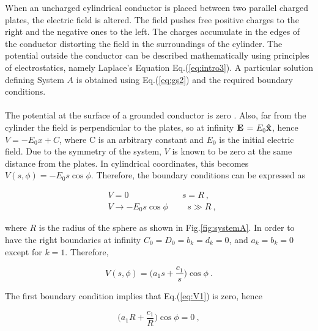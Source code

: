 \documentclass[a4paper]{jpconf}
\begin{document}
When an uncharged cylindrical conductor is placed between two parallel charged plates, the electric field is altered. The field pushes free positive charges to the right and the negative ones to the left. The charges accumulate in the edges of the conductor distorting the field in the surroundings of the cylinder. The potential outside the conductor can be described mathematically using principles of electrostatics, namely Laplace's Equation Eq.(\ref{eq:intro3}). %
A particular solution defining System $A$ is obtained using Eq.(\ref{eq:gs2}) and the required boundary conditions. \\ \\ 


The potential at the surface of a grounded conductor is zero \cite{griffiths-introElec}. Also, far from the cylinder the field is perpendicular to the plates, so at infinity $\bf{E}$ = $E_0$$\bf{\hat{x}}$, hence $V = -E_0 x + C$, where C is an arbitrary constant and $E_0$ is the initial electric field. Due to the symmetry of the system, $V$ is known to be zero at the same distance from the plates. In cylindrical coordinates, this becomes $V(s,\phi) = -E_0 s \cos{\phi}$. Therefore, the boundary conditions can be expressed as

\begin{subequations}
\begin{align}
&V = 0  \hspace{75pt} s = R~,\\ 
&V \to -E_0 s \cos{\phi} \hspace{27pt} s \gg R~,
\end{align}
\end{subequations}

\noindent where $R$ is the radius of the sphere as shown in Fig.\ref{fig:systemA}. In order to have the right boundaries at infinity $C_0 = D_0 = b_k = d_k=0$, and $a_k = b_k=0$ except for $k=1$. Therefore,

\begin{equation}
V(s,\phi) = \bigg( a_1 s + \frac{c_1}{s}\bigg) \cos{\phi}~.
\label{eq:V1}
\end{equation}

The first boundary condition implies that Eq.(\ref{eq:V1}) is zero, hence

\begin{equation}
\bigg( a_1 R + \frac{c_1}{R}\bigg) \cos{\phi} = 0~,
\end{equation} 
\end{document}
